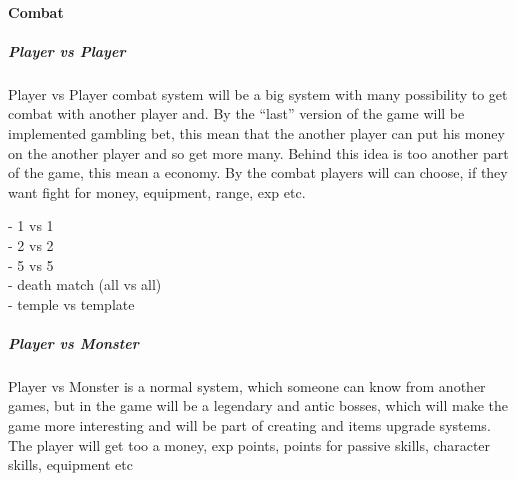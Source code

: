 \documentclass[parskip=full]{scrartcl}
\begin{document}
					\paragraph{Combat} \vspace{-5mm}
						\subparagraph{Player vs Player} \vspace{-5mm}
							\par \begingroup
							\leftskip=2cm
							\noindent
									Player vs Player combat system will be a big system with many possibility to get combat with another player and. By the “last” version of the game will be implemented gambling bet, this mean that the another player can put his money on the another player and so get more many. Behind this idea is too another part of the game, this mean a economy. By the combat players will can choose, if they want fight for money, equipment, range, exp etc.
									\par \begingroup
									\leftskip=2cm
									\noindent
											- 1 vs 1 \\
											- 2 vs 2 \\
											- 5 vs 5 \\
											- death match (all vs all) \\
											- temple vs template \\
									\par \endgroup
							\par \endgroup
						\subparagraph{Player vs Monster} \vspace{-5mm}
							\par \begingroup
							\leftskip=2cm
							\noindent
									Player vs Monster is a normal system, which someone can know from another games, but in the game will be a legendary and antic bosses, which will make the game more interesting and will be part of creating and items upgrade systems. The player will get too a money, exp points, points for passive skills, character skills, equipment etc
							\par \endgroup
\end{document}
